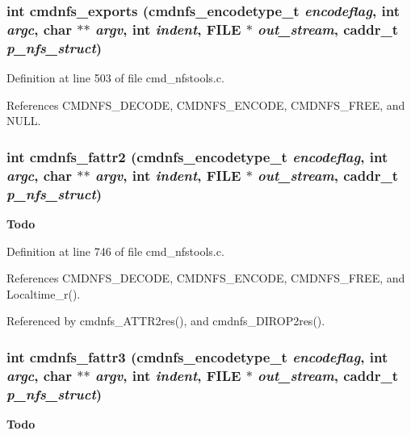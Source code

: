 \subsubsection{\setlength{\rightskip}{0pt plus 5cm}int cmdnfs\_\-exports ({\bf cmdnfs\_\-encodetype\_\-t} {\em encodeflag}, int {\em argc}, char $\ast$$\ast$ {\em argv}, int {\em indent}, FILE $\ast$ {\em out\_\-stream}, caddr\_\-t {\em p\_\-nfs\_\-struct})}\label{cmd__nfstools_8c_a65}




Definition at line 503 of file cmd\_\-nfstools.c.

References CMDNFS\_\-DECODE, CMDNFS\_\-ENCODE, CMDNFS\_\-FREE, and NULL.
\subsubsection{\setlength{\rightskip}{0pt plus 5cm}int cmdnfs\_\-fattr2 ({\bf cmdnfs\_\-encodetype\_\-t} {\em encodeflag}, int {\em argc}, char $\ast$$\ast$ {\em argv}, int {\em indent}, FILE $\ast$ {\em out\_\-stream}, caddr\_\-t {\em p\_\-nfs\_\-struct})}\label{cmd__nfstools_8c_a69}


\begin{Desc}
\item[{\bf Todo}]\end{Desc}


Definition at line 746 of file cmd\_\-nfstools.c.

References CMDNFS\_\-DECODE, CMDNFS\_\-ENCODE, CMDNFS\_\-FREE, and Localtime\_\-r().

Referenced by cmdnfs\_\-ATTR2res(), and cmdnfs\_\-DIROP2res().
\subsubsection{\setlength{\rightskip}{0pt plus 5cm}int cmdnfs\_\-fattr3 ({\bf cmdnfs\_\-encodetype\_\-t} {\em encodeflag}, int {\em argc}, char $\ast$$\ast$ {\em argv}, int {\em indent}, FILE $\ast$ {\em out\_\-stream}, caddr\_\-t {\em p\_\-nfs\_\-struct})}\label{cmd__nfstools_8c_a82}


\begin{Desc}
\item[{\bf Todo}]\end{Desc}


